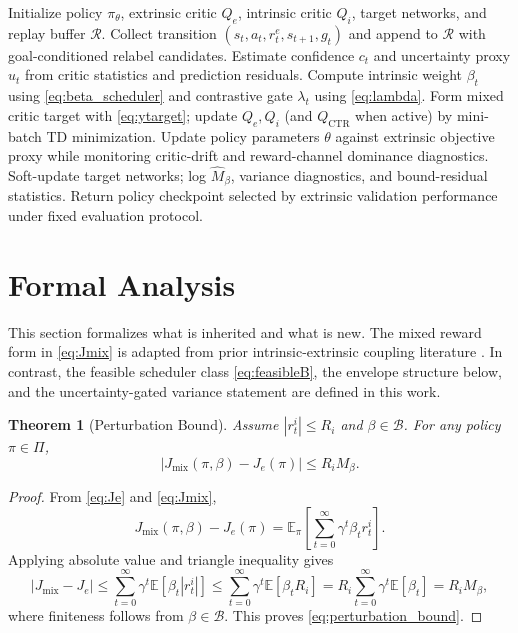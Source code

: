 \documentclass{article} %
\newtheorem{theorem}{Theorem}[section]
\begin{document}
\begin{algorithm}[t]
\caption{CCGO-RL Training Loop}
\label{alg:ccgo}
\begin{algorithmic}[1]
\STATE Initialize policy $\pi_\theta$, extrinsic critic $Q_e$, intrinsic critic $Q_i$, target networks, and replay buffer $\mathcal{R}$.
  \STATE Collect transition $(s_t,a_t,r_t^e,s_{t+1},g_t)$ and append to $\mathcal{R}$ with goal-conditioned relabel candidates.
  \STATE Estimate confidence $c_t$ and uncertainty proxy $u_t$ from critic statistics and prediction residuals.
  \STATE Compute intrinsic weight $\beta_t$ using \eqref{eq:beta_scheduler} and contrastive gate $\lambda_t$ using \eqref{eq:lambda}.
  \STATE Form mixed critic target with \eqref{eq:ytarget}; update $Q_e,Q_i$ (and $Q_{\mathrm{CTR}}$ when active) by mini-batch TD minimization.
  \STATE Update policy parameters $\theta$ against extrinsic objective proxy while monitoring critic-drift and reward-channel dominance diagnostics.
  \STATE Soft-update target networks; log $\widehat{M}_\beta$, variance diagnostics, and bound-residual statistics.
\ENDFOR
\STATE Return policy checkpoint selected by extrinsic validation performance under fixed evaluation protocol.
\end{algorithmic}
\end{algorithm}

\section{Formal Analysis}
\label{sec:theory}

This section formalizes what is inherited and what is new. The mixed reward form in \eqref{eq:Jmix} is adapted from prior intrinsic-extrinsic coupling literature \citep{arxiv1705_05363, arxiv1810_12894, arxiv2602_24081}. In contrast, the feasible scheduler class \eqref{eq:feasibleB}, the envelope structure below, and the uncertainty-gated variance statement are defined in this work.

\begin{theorem}[Perturbation Bound]
\label{thm:perturbation}
Assume $|r_t^i|\le R_i$ and $\beta\in\mathcal{B}$. For any policy $\pi\in\Pi$,
\begin{equation}
\label{eq:perturbation_bound}
\left|J_{\mathrm{mix}}(\pi,\beta)-J_e(\pi)\right|\le R_i M_\beta.
\end{equation}
\end{theorem}
\begin{proof}
From \eqref{eq:Je} and \eqref{eq:Jmix},
\[
J_{\mathrm{mix}}(\pi,\beta)-J_e(\pi)=\mathbb{E}_{\pi}\!\left[\sum_{t=0}^{\infty}\gamma^t\beta_t r_t^i\right].
\]
Applying absolute value and triangle inequality gives
\[
\left|J_{\mathrm{mix}}-J_e\right|\le \sum_{t=0}^{\infty}\gamma^t\mathbb{E}[\beta_t|r_t^i|]
\le \sum_{t=0}^{\infty}\gamma^t\mathbb{E}[\beta_t R_i]
=R_i\sum_{t=0}^{\infty}\gamma^t\mathbb{E}[\beta_t]=R_iM_\beta,
\]
where finiteness follows from $\beta\in\mathcal{B}$. This proves \eqref{eq:perturbation_bound}.
\end{proof}
\end{document}
